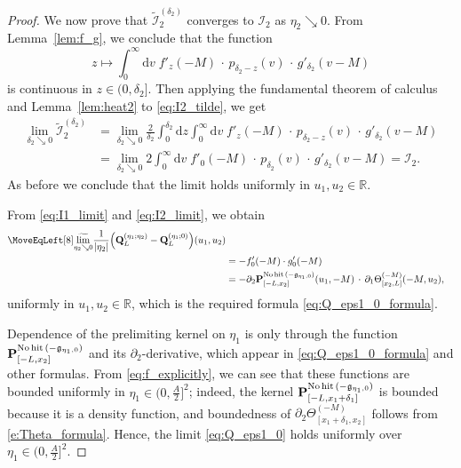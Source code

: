 \documentclass[oneside,final,11pt]{amsart}
\theoremstyle{definition}
\newcommand\nohit{\uptext{No\! hit}}
\newcommand{\fg}{\mathfrak{g}}
\renewcommand{\d}{\mathrm{d}}
\newcommand{\mylim}[1]{\underset{#1}{\wt{\mathrm{lim}}}}
\newcommand{\R}{\mathbb{R}}
\newcommand{\1}[1]{\mathbf{1}_{#1}}
\newcommand{\wt}{\widetilde}
\newcommand{\uptext}[1]{\text{\upshape{#1}}}
\newcommand{\fx}{x}
\newcommand{\fM}{M}
\newcommand{\fP}{\mathbf{P}}
\newcommand{\fQ}{\mathbf{Q}}
\newcommand{\CI}{\mathcal{I}}
\numberwithin{equation}{section}
\begin{document}
\begin{proof}
We now prove that $\wt{\CI}^{(\delta_2)}_2$ converges to $\CI_2$ as $\eta_2 \searrow 0$. From Lemma~\ref{lem:f_g}, we conclude that the function
\begin{equation}
	z  \mapsto   \int_{0}^{\infty} \d v\; f'_z(-M) \,\cdot\, p_{\delta_2 - z}(v) \,\cdot\, g'_{\delta_2}(v - M)
\end{equation}
is continuous in $z \in (0, \delta_2]$. Then applying the fundamental theorem of calculus and Lemma~\ref{lem:heat2} to \eqref{eq:I2_tilde}, we get
\begin{align}\label{eq:I2_limit}
	\lim_{\delta_2 \searrow 0} \wt{\CI}^{(\delta_2)}_2 &= \lim_{\delta_2 \searrow 0} \frac{2}{\delta_2} \int_{0}^{\delta_2} \d z \int_{0}^{\infty} \d v\; f'_z(-M) \,\cdot\, p_{\delta_2 - z}(v) \,\cdot\, g'_{\delta_2}(v - M)\\
	&= \lim_{\delta_2 \searrow 0} 2 \int_{0}^{\infty} \d v\; f'_0(-M) \,\cdot\, p_{\delta_2}(v) \,\cdot\, g'_{\delta_2}(v - M) = \CI_2.
\end{align}
As before we conclude that the limit holds uniformly in $u_1, u_2 \in \R$.

From \eqref{eq:I1_limit} and \eqref{eq:I2_limit}, we obtain
\begin{equation}
	\begin{split}
	\MoveEqLeft[8]
	\mylim{\eta_2 \searrow 0} \frac{1}{|\eta_2|} \Bigl(\fQ_L^{(\eta_1; \eta_2)} - \fQ_L^{(\eta_1; 0)}\Bigr)(u_1, u_2)\\
	&= - f'_0(-M) \cdot g'_{0}(-M)\\
	&= -\partial_{2} \fP_{[-L,\fx_2]}^{\nohit\,(-\fg_{\eta_1, 0})} (u_1, -\fM)\,\cdot\,\partial_{1} \Theta^{(-\fM)}_{[\fx_2, L]} (-\fM, u_2),
	\end{split}\label{eq:Q1_limit_proof}
\end{equation}
uniformly in $u_1, u_2 \in \R$, which is the required formula \eqref{eq:Q_eps1_0_formula}.

 Dependence of the prelimiting kernel on $\eta_1$ is only through the function $\fP_{[-L,\fx_2]}^{\nohit\,(-\fg_{\eta_1, 0})}$ and  its $\partial_{2}$-derivative, which appear in \eqref{eq:Q_eps1_0_formula} and other formulas. From \eqref{eq:f_explicitly}, we can see that these functions are bounded uniformly in $\eta_1 \in (0, \frac{A}{2}]^2$; indeed, the kernel $\fP_{[-L,\fx_1 + \delta_1]}^{\nohit\,(-\fg_{\eta_1, 0})}$ is bounded because it is a density function, and boundedness of $\partial_{2} \Theta^{(-\fM)}_{[\fx_1 + \delta_1, x_2]}$ follows from \eqref{e:Theta_formula}. Hence, the limit \eqref{eq:Q_eps1_0} holds uniformly over $\eta_1 \in (0, \frac{A}{2}]^2$.


\end{proof}
\end{document}
